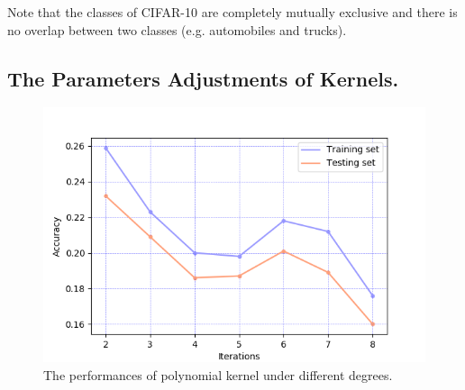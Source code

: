 \documentclass[12pt,a4paper]{article}
\theoremstyle{definition}
\begin{document}
\begin{appendix}
\vspace{0.01\linewidth}
Note that the classes of CIFAR-10 are completely mutually exclusive and there is no overlap between two classes (e.g. automobiles and trucks).

\subsection{The Parameters Adjustments of Kernels.}
\label{apd:para-adj}

\begin{figure}[H]
	\centering
	\includegraphics[width=0.7\linewidth]{img/svm_poly_para.png}
	\caption{The performances of polynomial kernel under different degrees.}
	\label{fig:para-adj-poly}
\end{figure}


\end{appendix}



\end{document}
